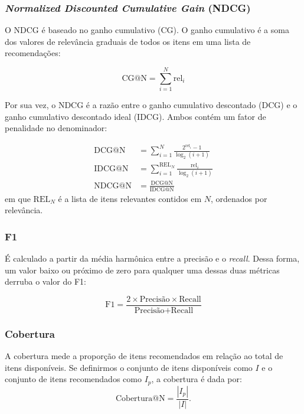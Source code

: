   \subsubsection{\textit{Normalized Discounted Cumulative Gain} (NDCG)}
  O NDCG é baseado no ganho cumulativo (CG). O ganho cumulativo é a soma dos
  valores de relevância graduais de todos os itens em uma lista de
  recomendações:

  \begin{equation}
    \text{CG@N} = \sum_{i = 1}^{N} \text{rel}_{i}
  \end{equation}
  
  Por sua vez, o NDCG é a razão entre o ganho cumulativo
  descontado (DCG) e o ganho cumulativo descontado ideal (IDCG). Ambos contém
  um fator de penalidade no denominador:

  \begin{align}
    \text{DCG@N} &= \sum_{i = 1}^{N} \frac{2^{\text{rel}_{i}} - 1}{\log_{2}(i + 1)} \\
    \text{IDCG@N} &= \sum_{i = 1}^{\text{REL}_N} \frac{\text{rel}_{i}}{{\log_{2}(i + 1)}} \\
    \text{NDCG@N} &= \frac{\text{DCG@N}}{\text{IDCG@N}}
  \end{align}
  em que $\text{REL}_N$ é a lista de itens relevantes contidos em $N$, ordenados
  por relevância.


  \subsubsection{F1}
É calculado a partir da média harmônica entre a precisão e o \textit{recall}. Dessa forma,
um valor baixo ou próximo de zero para qualquer uma dessas duas métricas derruba
o valor do F1:

\begin{equation}
  \text{F1} = \frac{2 \times \text{Precisão} \times \text{Recall}}{\text{Precisão} + \text{Recall}}
\end{equation}

  \subsubsection{Cobertura}
  A cobertura mede a proporção de itens recomendados em relação ao total de
  itens disponíveis. Se definirmos o conjunto de itens disponíveis como $I$ e o
  conjunto de itens recomendados como $I_{p}$, a cobertura é dada por:
  \begin{equation}
    \text{Cobertura@N} = \frac{|I_{p}|}{|I|}.
  \end{equation}


